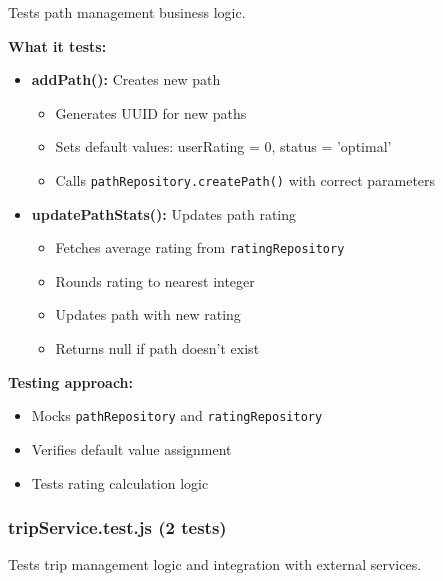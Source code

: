 Tests path management business logic.

\textbf{What it tests:}
\begin{itemize}
    \item \textbf{addPath():} Creates new path
    \begin{itemize}
        \item Generates UUID for new paths
        \item Sets default values: userRating = 0, status = 'optimal'
        \item Calls \texttt{pathRepository.createPath()} with correct parameters
    \end{itemize}
    
    \item \textbf{updatePathStats():} Updates path rating
    \begin{itemize}
        \item Fetches average rating from \texttt{ratingRepository}
        \item Rounds rating to nearest integer
        \item Updates path with new rating
        \item Returns null if path doesn't exist
    \end{itemize}
\end{itemize}

\textbf{Testing approach:}
\begin{itemize}
    \item Mocks \texttt{pathRepository} and \texttt{ratingRepository}
    \item Verifies default value assignment
    \item Tests rating calculation logic
\end{itemize}

\subsubsection{tripService.test.js (2 tests)}
\label{subsubsec:trip_service_test}

Tests trip management logic and integration with external services.

